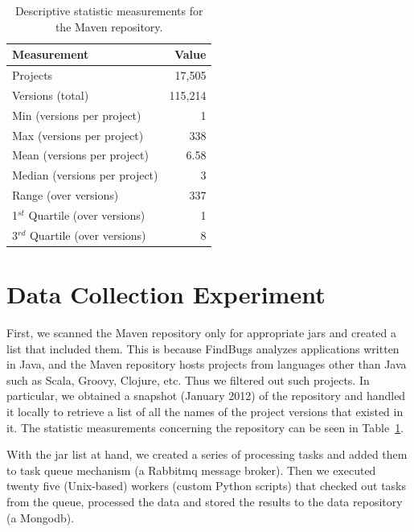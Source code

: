 \documentclass{sig-alternate}
\begin{document}
\begin{table}
\centering
\begin{tabular}{l r}
\hline
Measurement & Value\\
 \hline
Projects & 17,505\\
Versions (total) & 115,214\\
Min (versions per project) & 1\\
Max (versions per project) & 338\\
Mean (versions per project) & 6.58\\
Median (versions per project) & 3\\
Range (over versions) & 337\\
1$^{st}$ Quartile (over versions) & 1\\
3$^{rd}$ Quartile (over versions) & 8\\
\hline
\end{tabular}
\caption{Descriptive statistic measurements for the Maven repository.}
\label{tbl:repository}
\end{table}

\section{Data Collection Experiment}
\label{sec:exp}

First, we scanned the Maven repository only
for appropriate {\sc jar}s and created a list that included them.
This is because FindBugs analyzes applications written in Java,
and the Maven repository hosts projects from
languages other than Java such as Scala, Groovy,
Clojure, etc. Thus we filtered out such projects.
In particular, we obtained a snapshot (January 2012) of
the repository and handled it locally to retrieve a list of all
the names of the project versions that existed in it.
The statistic measurements concerning the repository can be seen in 
Table~\ref{tbl:repository}.

With the {\sc jar} list at hand, we created a series of processing tasks
and added them to task queue mechanism (a Rabbit{\sc mq} message
broker). Then we executed twenty five (Unix-based)
workers (custom Python scripts) that checked out tasks
from the queue, processed the data and stored the
results to the data repository (a Mongo{\sc db}).
\end{document}
